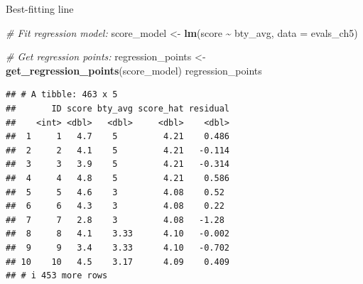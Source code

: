 \documentclass[
  ignorenonframetext,
]{beamer}
\newenvironment{Shaded}{\begin{snugshade}}{\end{snugshade}}
\newcommand{\AttributeTok}[1]{\textcolor[rgb]{0.13,0.29,0.53}{#1}}
\newcommand{\CommentTok}[1]{\textcolor[rgb]{0.56,0.35,0.01}{\textit{#1}}}
\newcommand{\FunctionTok}[1]{\textcolor[rgb]{0.13,0.29,0.53}{\textbf{#1}}}
\newcommand{\NormalTok}[1]{#1}
\newcommand{\OtherTok}[1]{\textcolor[rgb]{0.56,0.35,0.01}{#1}}
\newcommand{\SpecialCharTok}[1]{\textcolor[rgb]{0.81,0.36,0.00}{\textbf{#1}}}
\begin{document}
\begin{frame}[fragile]{Best-fitting line}
\protect\hypertarget{best-fitting-line-2}{}
\tiny

\begin{Shaded}
\begin{Highlighting}[]
\CommentTok{\# Fit regression model:}
\NormalTok{score\_model }\OtherTok{\textless{}{-}} \FunctionTok{lm}\NormalTok{(score }\SpecialCharTok{\textasciitilde{}}\NormalTok{ bty\_avg, }
                  \AttributeTok{data =}\NormalTok{ evals\_ch5)}

\CommentTok{\# Get regression points:}
\NormalTok{regression\_points }\OtherTok{\textless{}{-}} \FunctionTok{get\_regression\_points}\NormalTok{(score\_model)}
\NormalTok{regression\_points}
\end{Highlighting}
\end{Shaded}

\begin{verbatim}
## # A tibble: 463 x 5
##       ID score bty_avg score_hat residual
##    <int> <dbl>   <dbl>     <dbl>    <dbl>
##  1     1   4.7    5         4.21    0.486
##  2     2   4.1    5         4.21   -0.114
##  3     3   3.9    5         4.21   -0.314
##  4     4   4.8    5         4.21    0.586
##  5     5   4.6    3         4.08    0.52 
##  6     6   4.3    3         4.08    0.22 
##  7     7   2.8    3         4.08   -1.28 
##  8     8   4.1    3.33      4.10   -0.002
##  9     9   3.4    3.33      4.10   -0.702
## 10    10   4.5    3.17      4.09    0.409
## # i 453 more rows
\end{verbatim}

\normalsize
\end{frame}
\end{document}
